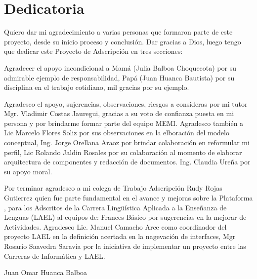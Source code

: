 \cleardoublepage
\hypertarget{Dedicatoria}{}

\chapter*{Dedicatoria}

Quiero dar mi agradecimiento a varias personas que formaron parte de este 
proyecto, desde su inicio proceso y conclusi\'{o}n. Dar gracias a Dios, 
luego tengo que dedicar este Proyecto de Adscripci\'{o}n en tres secciones:

Agradecer el apoyo incondicional a Mam\'{a} (Julia Balboa Choquecota) por su 
admirable ejemplo de responsabilidad, Pap\'{a} (Juan Huanca Bautista) por
su disciplina en el trabajo cotidiano, mil gracias por su ejemplo.

Agradesco el apoyo, sujerencias, observaciones, riesgos a consideras por mi 
tutor Mgr. Vladimir Costas Jauregui, gracias a su voto de confianza puesta en 
mi persona y por brindarme formar parte del equipo MEMI. Agradesco tambi\'{e}n
a Lic Marcelo Flores Soliz por sus observaciones en la elboraci\'{o}n del 
modelo conceptual, Ing. Jorge Orellana Araoz por brindar colaboraci\'{o}n en 
reformular mi perfil, Lic Rolando Jaldin Rosales por su colaboraci\'{o}n al 
momento de elaborar arquitectura de componentes y redacci\'{o}n de documentos. 
Ing. Claudia Ure\~{n}a por su apoyo moral.

Por terminar agradesco a mi colega de Trabajo Adscripci\'{o}n Rudy Rojas 
Gutierrez quien fue parte fundamental en el avance y mejoras sobre la Plataforma
, para los Adscritos de la Carrera Ling\"{u}\'{i}stica Aplicada a la 
Ense\~{n}anza de Lenguas (LAEL) al equipos de: Frances B\'{a}sico por sugerencias
en la mejorar de Actividades. Agradesco Lic. Manuel Camacho Arce como coordinador
del proyecto LAEL en la definici\'{o}n acertada en la nagevaci\'{o}n de 
interfaces, Mgr Rosario Saavedra Saravia por la iniciativa de implementar un 
proyecto entre las Carreras de Inform\'{a}tica y LAEL. 

\begin{flushright}
    Juan Omar Huanca Balboa
\end{flushright}